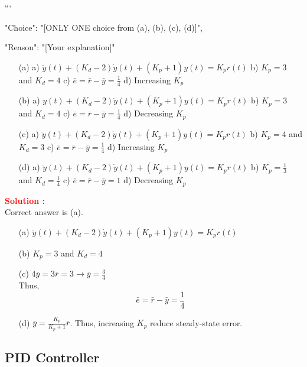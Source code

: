 \documentclass[12pt]{article}
\begin{document}
```
{

"Choice": "[ONLY ONE choice from (a), (b), (c), (d)]",

"Reason": "[Your explanation]"

}

\begin{itemize}
    \item[(a)] a) \(\ddot{y}(t) + (K_d-2) \dot{y}(t) + (K_p+1)y(t) = K_p r(t)\) b) \(K_p = 3\) and \(K_d = 4\) c) \(\bar{e} = \bar{r} - \bar{y} = \frac{1}{4}\) d) Increasing \(K_p\)
    \item[(b)] a) \(\ddot{y}(t) + (K_d-2) \dot{y}(t) + (K_p+1)y(t) = K_p r(t)\) b) \(K_p = 3\) and \(K_d = 4\) c) \(\bar{e} = \bar{r} - \bar{y} = \frac{1}{4}\) d) Decreasing \(K_p\)
    \item[(c)] a) \(\ddot{y}(t) + (K_d-2) \dot{y}(t) + (K_p+1)y(t) = K_p r(t)\) b) \(K_p = 4\) and \(K_d = 3\) c) \(\bar{e} = \bar{r} - \bar{y} = \frac{1}{4}\) d) Increasing \(K_p\)
    \item[(d)] a) \(\ddot{y}(t) + (K_d-2) \dot{y}(t) + (K_p+1)y(t) = K_p r(t)\) b) \(K_p = \frac{1}{3}\) and \(K_d = \frac{1}{4}\) c) \(\bar{e} = \bar{r} - \bar{y} = 1\) d) Decreasing \(K_p\)
\end{itemize}

\textbf{\textcolor{red}{Solution :}} \\
Correct answer is (a).\\
\begin{itemize}
    \item[(a)] \(\ddot{y}(t) + (K_d-2) \dot{y}(t) + (K_p+1)y(t) = K_p r(t)\)
    \item[(b)] \(K_p = 3\) and \(K_d = 4\)
    \item[(c)] \(4 \bar{y} = 3 \bar{r} = 3 \rightarrow \bar{y} = \frac{3}{4}\) \\
    Thus,
    \begin{equation}
        \bar{e} = \bar{r} - \bar{y} = \frac{1}{4}
    \end{equation}
    \item[(d)] \(\bar{y} = \frac{K_p}{K_p + 1} \bar{r}\).
    Thus, increasing \(K_p\) reduce steady-state error.
\end{itemize}
\clearpage

\subsection{PID Controller}
\end{document}
